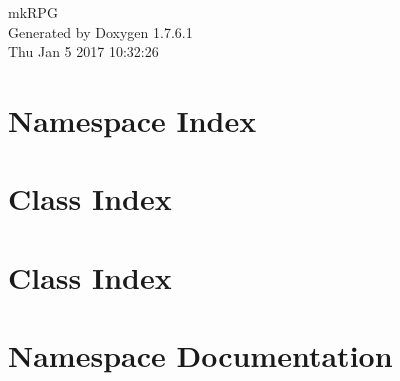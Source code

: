 \documentclass[a4paper]{book}
\begin{document}
\hypersetup{pageanchor=false,citecolor=blue}
\begin{titlepage}
\vspace*{7cm}
\begin{center}
{\Large mk\-R\-P\-G }\\
\vspace*{1cm}
{\large \-Generated by Doxygen 1.7.6.1}\\
\vspace*{0.5cm}
{\small Thu Jan 5 2017 10:32:26}\\
\end{center}
\end{titlepage}
\clearemptydoublepage
{}
\tableofcontents
\clearemptydoublepage
{}
\hypersetup{pageanchor=true,citecolor=blue}
\chapter{\-Namespace \-Index}

\chapter{\-Class \-Index}

\chapter{\-Class \-Index}

\chapter{\-Namespace \-Documentation}
































\end{document}
